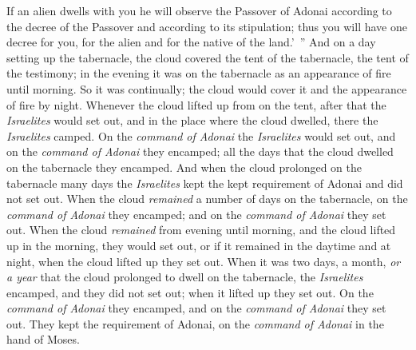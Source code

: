 \begin{biblechapter}
\verse If an alien dwells with you he will observe the Passover of Adonai according to the decree of the Passover and according to its stipulation; thus you will have one decree for you, for the alien and for the native of the land.’ ”
 And on a day setting up the tabernacle, the cloud covered the tent of the tabernacle, the tent of the testimony; in the evening it was on the tabernacle as an appearance of fire until morning.
\verse So it was continually; the cloud would cover it and the appearance of fire by night.
\verse Whenever the cloud lifted up from on the tent, after that the \textit{Israelites} would set out, and in the place where the cloud dwelled, there the \textit{Israelites} camped.
\verse On the \textit{command of Adonai} the \textit{Israelites} would set out, and on the \textit{command of Adonai} they encamped; all the days that the cloud dwelled on the tabernacle they encamped.
\verse And when the cloud prolonged on the tabernacle many days the \textit{Israelites} kept the kept requirement of Adonai and did not set out.
\verse When the cloud \textit{remained} a number of days on the tabernacle, on the \textit{command of Adonai} they encamped; and on the \textit{command of Adonai} they set out.
\verse When the cloud \textit{remained} from evening until morning, and the cloud lifted up in the morning, they would set out, or if it remained in the daytime and at night, when the cloud lifted up they set out.
\verse When it was two days, a month, \textit{or a year} that the cloud prolonged to dwell on the tabernacle, the \textit{Israelites} encamped, and they did not set out; when it lifted up they set out.
\verse On the \textit{command of Adonai} they encamped, and on the \textit{command of Adonai} they set out. They kept the requirement of Adonai, on the \textit{command of Adonai} in the hand of Moses.
\end{biblechapter}

